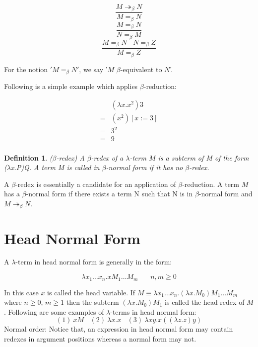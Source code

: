 \documentclass[a4paper,11pt,twoside]{report}
\newtheorem{def1}{\textbf{Definition}}[chapter]
\begin{document}
\begin{equation*}
\frac{M\twoheadrightarrow _\beta N}{M = _\beta N}
\end{equation*}
\begin{equation*}
\frac{M = _\beta N}{N = _\beta M}
\end{equation*}
\begin{equation*}
\frac{M = _\beta N\ \ \ \ N = _\beta Z}{M = _\beta Z}
\end{equation*}

For the notion $'M = _\beta N'$, we say '$M$ $\beta$-equivalent to $N$'. 

\noindent Following is a simple example which applies $\beta$-reduction:

\begin{equation*}
\begin{array}{ll}
&(\lambda x.x^2)3\\
=& (x^2)[x:=3] \\
=& 3^2 \\
=&9 \\
\end{array}
\end{equation*}


\begin{def1}
($\beta$-redex) A $\beta$-redex of a $\lambda$-term $M$ is a subterm of M of the form ($\lambda$x.P)Q. A term M is called in $\beta$-normal form if it has no $\beta$-redex.
\end{def1}
A $\beta$-redex is essentially a candidate for an application of $\beta$-reduction. A term $M$ has a $\beta$-normal form if there exists a term N such that N is in $\beta$-normal form and $M \twoheadrightarrow _\beta N$. 

\section{Head Normal Form}

\noindent A $\lambda$-term in head normal form is generally in the form:

\begin{equation*}
\lambda x_1\ldots x_n.xM_1\ldots M_m\ \ \ \ \ \ \ \ n,m\geqslant 0
\end{equation*}

In this case $x$ is called the head variable. If $M \equiv \lambda x_1\ldots x_n.(\lambda x.M_0)M_1\ldots M_m$ where $n\geqslant 0$, $m\geqslant 1$ then the subterm $(\lambda x.M_0)M_1$ is called the head redex of $M$. Following are some examples of $\lambda$-terms in head normal form:
\begin{equation*}
(1)\ xM\ \ \ \ (2)\ \lambda x.x\ \ \ \ (3)\ \lambda xy.x((\lambda z.z)y)
\end{equation*}Normal order:
Notice that, an expression in head normal form may contain redexes in argument positions whereas a normal form may not.
\end{document}
